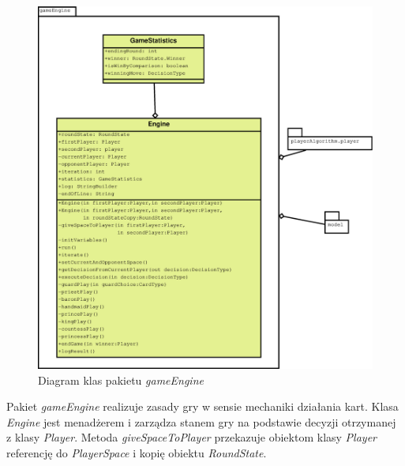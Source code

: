 \begin{figure}[H]
	\centering
	\includegraphics[width=\textwidth]{Resources/diagramKlas_engine.eps}
	\caption{Diagram klas pakietu \textit{gameEngine}} 
	\label{fig:diagramKlasEngine}
\end{figure}
Pakiet \textit{gameEngine} realizuje zasady gry w sensie mechaniki działania kart. Klasa \textit{Engine} jest menadżerem i zarządza stanem gry na podstawie decyzji otrzymanej z klasy \textit{Player}. Metoda \textit{giveSpaceToPlayer} przekazuje obiektom klasy \textit{Player} referencję do \textit{PlayerSpace} i kopię obiektu \textit{RoundState}. 


